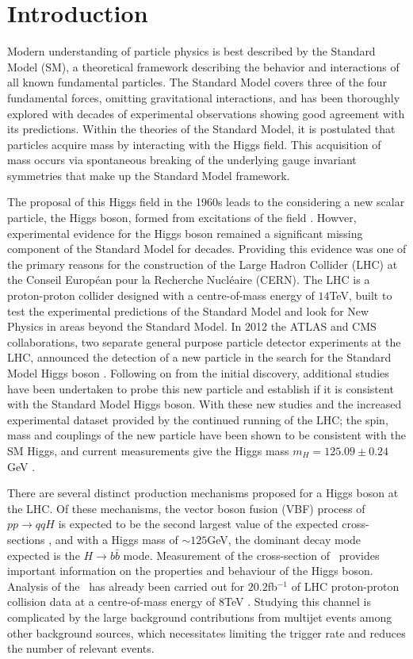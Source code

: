 \chapter{Introduction}
\label{c:intro}

Modern understanding of particle physics is best described by the Standard Model (SM), a theoretical framework describing the behavior and interactions of all known fundamental particles. The Standard Model covers three of the four fundamental forces, omitting gravitational interactions, and has been thoroughly explored with decades of experimental observations showing good agreement with its predictions. Within the theories of the Standard Model, it is postulated that particles acquire mass by interacting with the Higgs field. This acquisition of mass occurs via spontaneous breaking of the underlying gauge invariant symmetries that make up the Standard Model framework.

The proposal of this Higgs field in the 1960s leads to the considering a new scalar particle, the Higgs boson, formed from excitations of the field \cite{gauge-boson-mass, higgs-1, higgs-2}. Howver, experimental evidence for the Higgs boson remained a significant missing component of the Standard Model for decades. Providing this evidence was one of the primary reasons for the construction of the Large Hadron Collider \cite{lhc} (LHC) at the  Conseil Europ\'{e}an pour la Recherche Nucl\'{e}aire (CERN). The LHC is a proton-proton collider designed with a centre-of-mass energy of $14$TeV, built to test the experimental predictions of the Standard Model and look for New Physics in areas beyond the Standard Model. In 2012 the ATLAS and CMS collaborations, two separate general purpose particle detector experiments at the LHC, announced the detection of a new particle in the search for the Standard Model Higgs boson \cite{cmshiggs, atlashiggs}. Following on from the initial discovery, additional studies have been undertaken to probe this new particle and establish if it is consistent with the Standard Model Higgs boson. With these new studies and the increased experimental dataset provided by the continued running of the LHC; the spin, mass and couplings of the new particle have been shown to be consistent with the SM Higgs, and current measurements give the Higgs mass $m_H=125.09\pm0.24$GeV \cite{pdg}.

There are several distinct production mechanisms proposed for a Higgs boson at the LHC. Of these mechanisms, the vector boson fusion (VBF) process of $pp\rightarrow qqH$ is expected to be the second largest value of the expected cross-sections \cite{LHCHiggsCS}, and with a Higgs mass of $\sim125$GeV, the dominant decay mode expected \cite{HDECAY} is the $H\rightarrow b\bar{b}$ mode. Measurement of the cross-section of \VBFHBB\ provides important information on the properties and behaviour of the Higgs boson. Analysis of the \VBFHBB\ has already been carried out for $20.2$fb$^{-1}$ of LHC proton-proton collision data at a centre-of-mass energy of $8$TeV \cite{VBFHbb8tev}. Studying this channel is complicated by the large background contributions from multijet events among other background sources, which necessitates limiting the trigger rate and reduces the number of relevant events.

